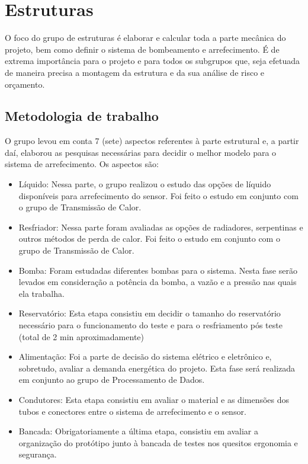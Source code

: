 \section{Estruturas}

O foco do grupo de estruturas é elaborar e calcular toda a parte mecânica do projeto, bem como definir o sistema de bombeamento e arrefecimento. É de extrema importância para o projeto e para todos os subgrupos que, seja efetuada de maneira precisa a montagem da estrutura e da sua análise de risco e orçamento.

\subsection{Metodologia de trabalho}

O grupo levou em conta 7 (sete) aspectos referentes à parte estrutural e, a partir daí, elaborou as pesquisas necessárias para decidir o melhor modelo para o sistema de arrefecimento. Os aspectos são:

\begin{itemize}
\item	Líquido: Nessa parte, o grupo realizou o estudo das opções de líquido disponíveis para arrefecimento do sensor. Foi feito o estudo em conjunto com o grupo de Transmissão de Calor.
\item	Resfriador: Nessa parte foram avaliadas as opções de radiadores, serpentinas e outros métodos de perda de calor. Foi feito o estudo em conjunto com o grupo de Transmissão de Calor.
\item	Bomba: Foram estudadas diferentes bombas para o sistema. Nesta fase serão levados em consideração a potência da bomba, a vazão e a pressão nas quais ela trabalha.
\item Reservatório: Esta etapa consistiu em decidir o tamanho do reservatório necessário para o funcionamento do teste e para o resfriamento pós teste (total de 2 min aproximadamente)
\item	Alimentação: Foi a parte de decisão do sistema elétrico e eletrônico e, sobretudo, avaliar a demanda energética do projeto. Esta fase será realizada em conjunto ao grupo de Processamento de Dados.
\item	Condutores: Esta etapa consistiu em avaliar o material e as dimensões dos tubos e conectores entre o sistema de arrefecimento e o sensor.
\item	Bancada: Obrigatoriamente a última etapa, consistiu em avaliar a organização do protótipo junto à bancada de testes nos quesitos ergonomia e segurança.
\end{itemize}

